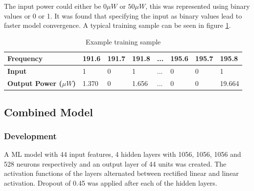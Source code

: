 The input power could either be $0\mu W$ or $50 \mu W$, this was represented using binary values or 0 or 1. It was found that specifying the input as binary values lead to faster model convergence.
A typical training sample can be seen in figure \ref{tab:ex_data_sample}.


\renewcommand{\arraystretch}{1.15}
\begin{table}[h!] 
    \centering
    \caption{Example training sample}
    \begin{tabular}{l l l l l l l l }
        \hline
        \textbf{Frequency} & 191.6 & 191.7 & 191.8 & ... & 195.6 & 195.7 & 195.8 \\
        \hline
        \textbf{Input} & 1 & 0 & 1 & ... & 0 & 0 &	1 \\
        \hline
        \textbf{Output Power ($\mu W$)} & 1.370 & 0 & 1.656 & ... & 0 &	0 &	19.664 \\
        \hline
    \end{tabular}
    \label{tab:ex_data_sample}
\end{table}


\subsection{Combined Model}


\subsubsection{Development}
\FloatBarrier

A ML model with 44 input features, 4 hidden layers with 1056, 1056, 1056 and 528 neurons respectively and an output layer of 44 units was created. The activation functions of the layers alternated between rectified linear and linear activation.  Dropout of 0.45 was applied after each of the hidden layers.


